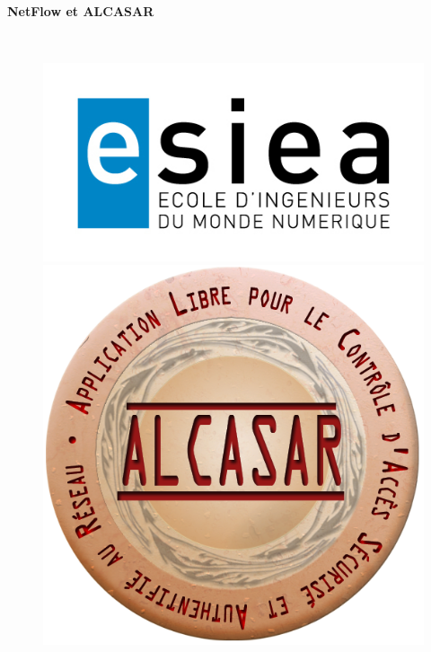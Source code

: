 \begin{titlepage}
      \begin{center}   
        \Huge
        \textbf{NetFlow et ALCASAR}
        
        \LARGE
        ~
        
        
        \vfill
        \begin{figure}[H]
	    \centering
	    \begin{minipage}{0.49\textwidth}
		\centering
		\includegraphics[width=\textwidth]{./img/esiea.jpeg}
	    \end{minipage}
	    \begin{minipage}{0.49\textwidth}
		\centering
		\includegraphics[width=.8\textwidth]{./img/Alcasar-logo.png}
	    \end{minipage}\hfill
	\end{figure}
        \vfill
        

\end{center}
\end{titlepage}

